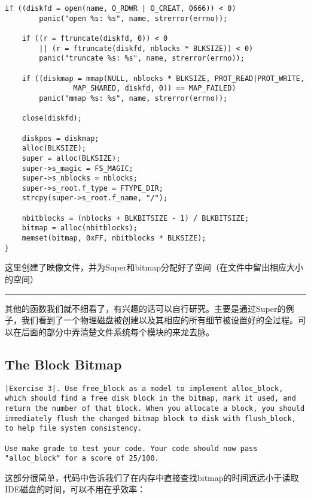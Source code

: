 \documentclass{article}
\begin{document}
\begin{CJK*}{UTF8}{gkai}
\begin{enumerate}
{\begin{lstlisting}[style=ccode, title={\scriptsize \ttfamily \bfseries fs/fsformat.c: opendisk()}]
	if ((diskfd = open(name, O_RDWR | O_CREAT, 0666)) < 0)
		panic("open %s: %s", name, strerror(errno));

	if ((r = ftruncate(diskfd, 0)) < 0
	    || (r = ftruncate(diskfd, nblocks * BLKSIZE)) < 0)
		panic("truncate %s: %s", name, strerror(errno));

	if ((diskmap = mmap(NULL, nblocks * BLKSIZE, PROT_READ|PROT_WRITE,
			    MAP_SHARED, diskfd, 0)) == MAP_FAILED)
		panic("mmap %s: %s", name, strerror(errno));

	close(diskfd);

	diskpos = diskmap;
	alloc(BLKSIZE);
	super = alloc(BLKSIZE);
	super->s_magic = FS_MAGIC;
	super->s_nblocks = nblocks;
	super->s_root.f_type = FTYPE_DIR;
	strcpy(super->s_root.f_name, "/");

	nbitblocks = (nblocks + BLKBITSIZE - 1) / BLKBITSIZE;
	bitmap = alloc(nbitblocks);
	memset(bitmap, 0xFF, nbitblocks * BLKSIZE);
}
\end{lstlisting}

这里创建了映像文件，并为Super和bitmap分配好了空间（在文件中留出相应大小的空间）

}
\end{enumerate}

\vspace{2em}
\hrule
\vspace{2em}

其他的函数我们就不细看了，有兴趣的话可以自行研究。主要是通过Super的例子，我们看到了一个物理磁盘被创建以及其相应的所有细节被设置好的全过程。可以在后面的部分中弄清楚文件系统每个模块的来龙去脉。

\subsection{The Block Bitmap}

\begin{lstlisting}[style=exercise]
|Exercise 3|. Use free_block as a model to implement alloc_block, which should find a free disk block in the bitmap, mark it used, and return the number of that block. When you allocate a block, you should immediately flush the changed bitmap block to disk with flush_block, to help file system consistency.

Use make grade to test your code. Your code should now pass "alloc_block" for a score of 25/100.
\end{lstlisting}

这部分很简单，代码中告诉我们了在内存中直接查找bitmap的时间远远小于读取IDE磁盘的时间，可以不用在乎效率：


\end{CJK*}
\end{document}
